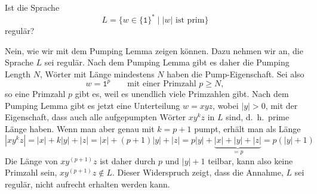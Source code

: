 Ist die Sprache
\[
L=\{w\in\{\texttt{1}\}^*\;|\;\text{$|w|$ ist prim}\}
\]
regulär?


\begin{loesung}
Nein, wie wir mit dem Pumping Lemma zeigen können.
Dazu nehmen wir an, die Sprache $L$ sei regulär.
Nach dem Pumping Lemma gibt es daher die Pumping Length $N$, Wörter
mit Länge mindestens $N$ haben die Pump-Eigenschaft.
Sei also 
\[
w=\texttt{1}^p\qquad\text{mit einer Primzahl $p\ge N$},
\]
so eine Primzahl $p$ gibt es, weil es unendlich viele Primzahlen gibt.
Nach dem Pumping Lemma gibt es jetzt eine Unterteilung $w=xyz$, wobei
$|y|>0$, mit der Eigenschaft, dass auch alle aufgepumpten Wörter
$xy^kz$ in $L$ sind, d.~h.~prime Länge haben.
Wenn man aber genau mit $k=p+1$ pumpt, erhält man als Länge
\[
|xy^kz|
=
|x| + k|y| + |z|
=
|x| + (p+1)|y| + |z|
=
p|y| + \underbrace{|x|+|y|+|z|}_{\textstyle=p}
=
p(|y|+1)
\]
Die Länge von $xy^{(p+1)}z$ ist daher durch $p$ und $|y|+1$ teilbar, kann also
keine Primzahl sein, $xy^{(p+1)}z\not\in L$.
Dieser Widerspruch zeigt, dass die Annahme, $L$ sei regulär, nicht
aufrecht erhalten werden kann.
\end{loesung}


